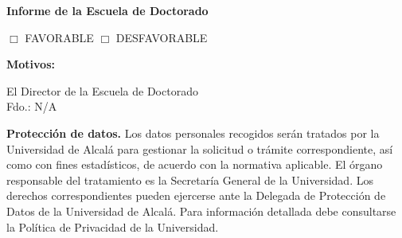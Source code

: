 \documentclass[11pt,a4paper,oneside]{article}
\newcommand{\PhDFormSection}[1]{%
  \vspace{0.45cm}\noindent\textbf{\large #1}\par\smallskip}
\newcommand{\PhDNA}{N/A}
\begin{document}
\PhDFormSection{Informe de la Escuela de Doctorado}
$\Box$ FAVORABLE \qquad $\Box$ DESFAVORABLE\par
\textbf{Motivos:}\par\vspace{3cm}
\begin{flushright}El Director de la Escuela de Doctorado\\[1.2cm]Fdo.: \PhDNA\end{flushright}
\vfill
{\scriptsize
\noindent\textbf{Protección de datos.} Los datos personales recogidos serán tratados por la Universidad de Alcalá para gestionar la solicitud o trámite correspondiente, así como con fines estadísticos, de acuerdo con la normativa aplicable. El órgano responsable del tratamiento es la Secretaría General de la Universidad. Los derechos correspondientes pueden ejercerse ante la Delegada de Protección de Datos de la Universidad de Alcalá. Para información detallada debe consultarse la Política de Privacidad de la Universidad.
}
\end{document}
